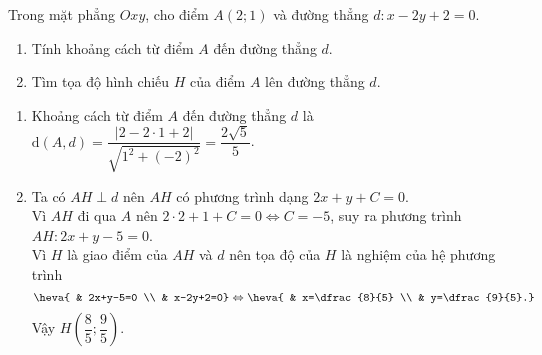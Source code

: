 \begin{bt}%
Trong mặt phẳng $Oxy$, cho điểm $A(2;1)$ và đường thẳng $d\colon x-2y+2=0$.
\begin{enumerate}
\item Tính khoảng cách từ điểm $A$ đến đường thẳng $d$.
\item Tìm tọa độ hình chiếu $H$ của điểm $A$ lên đường thẳng $d$.
\end{enumerate}
\loigiai
{
\begin{enumerate}
\item Khoảng cách từ điểm $A$ đến đường thẳng $d$ là $\mathrm{d}(A,d)=\dfrac{|2-2\cdot1+2|}{\sqrt{1^2+\left(-2\right)^2}}=\dfrac{2\sqrt{5}}{5}$.
\item Ta có $AH\perp d$ nên $AH$ có phương trình dạng $2x+y+C=0$. \\
Vì $AH$ đi qua $A$ nên $2\cdot2+1+C=0 \Leftrightarrow C=-5$, suy ra phương trình $AH\colon 2x+y-5=0$. \\
Vì $H$ là giao điểm của $AH$ và $d$ nên tọa độ của $H$ là nghiệm của hệ phương trình
$$\heva{ & 2x+y-5=0 \\ & x-2y+2=0} \Leftrightarrow \heva{ & x=\dfrac{8}{5} \\ & y=\dfrac{9}{5}.}$$
Vậy $H\left(\dfrac{8}{5};\dfrac{9}{5}\right)$.
\end{enumerate}
}
\end{bt}